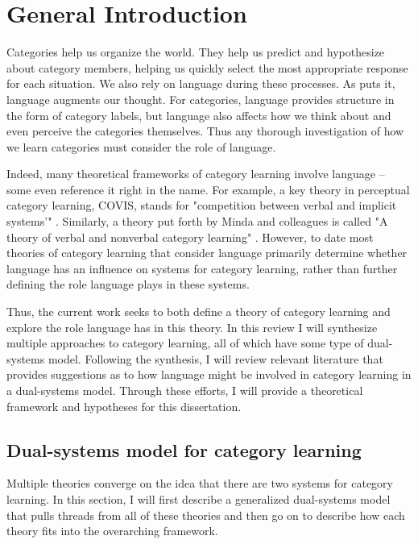 \documentclass[../dissertation.tex]{subfiles}
\begin{document}
\section{General Introduction}

	Categories help us organize the world. They help us predict and hypothesize about category members, helping us quickly select the most appropriate response for each situation. We also rely on language during these processes. As \citet{Lupyan2012} puts it, language augments our thought. For categories, language provides structure in the form of category labels, but language also affects how we think about and even perceive the categories themselves. Thus any thorough investigation of how we learn categories must consider the role of language. \par
	Indeed, many theoretical frameworks of category learning involve language -- some even reference it right in the name. For example, a key theory in perceptual category learning, COVIS, stands for "competition between verbal and implicit systems'" \citep{Ashby1998}. Similarly, a theory put forth by Minda and colleagues is called "A theory of verbal and nonverbal category learning" \citep{Minda2010}. However, to date most theories of category learning that consider language primarily determine whether language has an influence on systems for category learning, rather than further defining the role language plays in these systems.\par
	Thus, the current work seeks to both define a theory of category learning and explore the role language has in this theory. In this review I will synthesize multiple approaches to category learning, all of which have some type of dual-systems model. Following the synthesis, I will review relevant literature that provides suggestions as to how language might be involved in category learning in a dual-systems model. Through these efforts, I will provide a theoretical framework and hypotheses for this dissertation.

\subsection{Dual-systems model for category learning}
	Multiple theories converge on the idea that there are two systems for category learning. In this section, I will first describe a generalized dual-systems model that pulls threads from all of these theories and then go on to describe how each theory fits into the overarching framework. 
	
\end{document}

